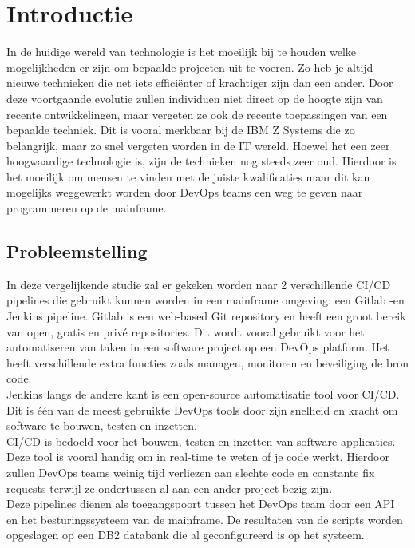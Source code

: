 
\section{Introductie}%
\label{sec:introductie}
In de huidige wereld van technologie is het moeilijk bij te houden welke mogelijkheden er zijn om bepaalde projecten uit te voeren. Zo heb je altijd nieuwe technieken die net iets efficiënter of krachtiger zijn dan een ander. Door deze voortgaande evolutie zullen individuen niet direct op de hoogte zijn van recente ontwikkelingen, maar vergeten ze ook de recente toepassingen van een bepaalde techniek. Dit is vooral merkbaar bij de IBM Z Systems die zo belangrijk, maar zo snel vergeten worden in de IT wereld. Hoewel het een zeer hoogwaardige technologie is, zijn de technieken nog steeds zeer oud. Hierdoor is het moeilijk om mensen te vinden met de juiste kwalificaties maar dit kan mogelijks weggewerkt worden door DevOps teams een weg te geven naar programmeren op de mainframe.


\subsection{Probleemstelling}
In deze vergelijkende studie zal er gekeken worden naar 2 verschillende CI/CD pipelines die gebruikt kunnen worden in een mainframe omgeving: een Gitlab -en Jenkins pipeline. 
Gitlab is een web-based Git repository en heeft een groot bereik van open, gratis en privé repositories. Dit wordt vooral gebruikt voor het automatiseren van taken in een software project op een DevOps platform. Het heeft verschillende extra functies zoals managen, monitoren en beveiliging de bron code. \autocite{Mohanan2023} \\
Jenkins langs de andere kant is een open-source automatisatie tool voor CI/CD. Dit is één van de meest gebruikte DevOps tools door zijn snelheid en kracht om software te bouwen, testen en inzetten. \autocite{Sharma2023} \\

CI/CD is bedoeld voor het bouwen, testen en inzetten van software applicaties. Deze tool is vooral handig om in real-time te weten of je code werkt. Hierdoor zullen DevOps teams weinig tijd verliezen aan slechte code en constante fix requests terwijl ze ondertussen al aan een ander project bezig zijn. \autocite{Poberezhnyk2023} \\
Deze pipelines dienen als toegangspoort tussen het DevOps team door een API en het besturingssysteem van de mainframe. De resultaten van de scripts worden opgeslagen op een DB2 databank die al geconfigureerd is op het systeem.
 
